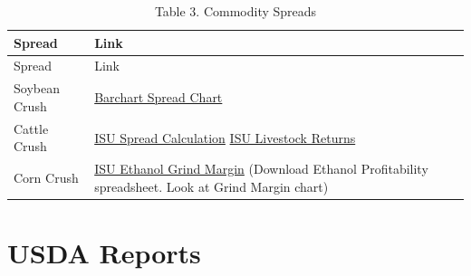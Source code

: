\documentclass[]{book}
\theoremstyle{definition}
\theoremstyle{definition}
\theoremstyle{remark}
\begin{document}
\begin{longtable}[]{@{}ll@{}}
\caption{Table 3. Commodity Spreads}\tabularnewline
\toprule
\begin{minipage}[b]{0.10\columnwidth}\raggedright\strut
Spread\strut
\end{minipage} & \begin{minipage}[b]{0.10\columnwidth}\raggedright\strut
Link\strut
\end{minipage}\tabularnewline
\midrule
\endfirsthead
\toprule
\begin{minipage}[b]{0.10\columnwidth}\raggedright\strut
Spread\strut
\end{minipage} & \begin{minipage}[b]{0.10\columnwidth}\raggedright\strut
Link\strut
\end{minipage}\tabularnewline
\midrule
\endhead
\begin{minipage}[t]{0.10\columnwidth}\raggedright\strut
Soybean Crush\strut
\end{minipage} & \begin{minipage}[t]{0.10\columnwidth}\raggedright\strut
\href{https://www.barchart.com/futures/quotes/CSZ17/interactive-chart}{Barchart
Spread Chart}\strut
\end{minipage}\tabularnewline
\begin{minipage}[t]{0.10\columnwidth}\raggedright\strut
Cattle Crush\strut
\end{minipage} & \begin{minipage}[t]{0.10\columnwidth}\raggedright\strut
\href{http://www2.econ.iastate.edu/estimated-returns/Finishing\%20Steer\%20Calves\%20Chart.pdf}{ISU
Spread Calculation}
\href{http://www2.econ.iastate.edu/estimated-returns/}{ISU Livestock
Returns}\strut
\end{minipage}\tabularnewline
\begin{minipage}[t]{0.10\columnwidth}\raggedright\strut
Corn Crush\strut
\end{minipage} & \begin{minipage}[t]{0.10\columnwidth}\raggedright\strut
\href{http://www.extension.iastate.edu/agdm/refirst.html}{ISU Ethanol
Grind Margin} (Download Ethanol Profitability spreadsheet. Look at Grind
Margin chart)\strut
\end{minipage}\tabularnewline
\bottomrule
\end{longtable}

\section{USDA Reports}\label{usda-reports}
\end{document}
